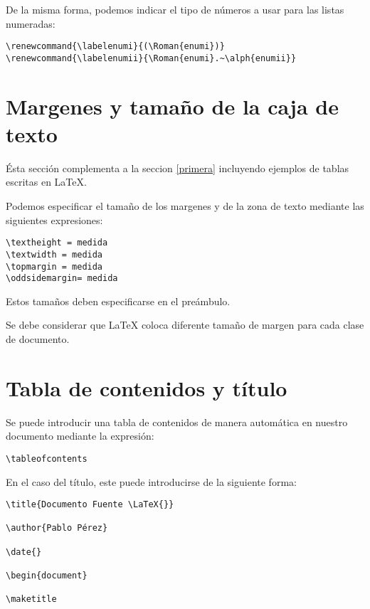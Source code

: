 \documentclass[letterpaper,12pt]{article}
\begin{document}
De la misma forma, podemos indicar el tipo de números a usar para las listas numeradas:

\begin{verbatim}
\renewcommand{\labelenumi}{(\Roman{enumi})}
\renewcommand{\labelenumii}{\Roman{enumi}.~\alph{enumii}}
\end{verbatim}

\section{Margenes y tamaño de la caja de texto}

Ésta sección complementa a la seccion \ref{primera} incluyendo ejemplos de tablas escritas en \LaTeX.

Podemos especificar el tamaño de los margenes y de la zona de texto mediante las siguientes expresiones:

\begin{verbatim}
\textheight = medida
\textwidth = medida
\topmargin = medida
\oddsidemargin= medida
\end{verbatim}

Estos tamaños deben especificarse en el preámbulo.

Se debe considerar que \LaTeX{} coloca diferente tamaño de margen para cada clase de documento.

\section{Tabla de contenidos y título}

Se puede introducir una tabla de contenidos de manera automática en nuestro documento mediante la expresión:

\begin{verbatim}
\tableofcontents
\end{verbatim}

En el caso del título, este puede introducirse de la siguiente forma:

\begin{verbatim}
\title{Documento Fuente \LaTeX{}}

\author{Pablo Pérez}

\date{}

\begin{document}

\maketitle
\end{verbatim}
\end{document}
